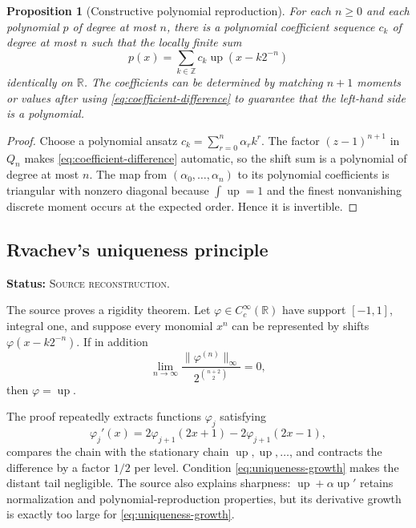 \documentclass[11pt,oneside]{article}
\newtheorem{proposition}[theorem]{Proposition}
\theoremstyle{definition}
\theoremstyle{remark}
\newcommand{\Up}{\operatorname{up}}
\newcommand{\R}{\mathbb{R}}
\newcommand{\Z}{\mathbb{Z}}
\newcommand{\SourceStatus}{\textcolor{SourceBlue}{\textsc{Source reconstruction}}}
\newcommand{\status}[1]{\par\smallskip\noindent\textbf{Status:} #1.\par\smallskip}
\begin{document}
\begin{proposition}[Constructive polynomial reproduction]
\label{prop:constructive-reproduction}
For each \(n\ge0\) and each polynomial \(p\) of degree at most \(n\), there is a polynomial coefficient sequence \(c_k\) of degree at most \(n\) such that the locally finite sum
\begin{equation}
  p(x)=\sum_{k\in\Z}c_k\Up(x-k2^{-n})
  \label{eq:poly-reproduce}
\end{equation}
identically on \(\R\).  The coefficients can be determined by matching \(n+1\) moments or values after using \eqref{eq:coefficient-difference} to guarantee that the left-hand side is a polynomial.
\end{proposition}

\begin{proof}
Choose a polynomial ansatz \(c_k=\sum_{r=0}^{n}\alpha_r k^r\).  The factor \((z-1)^{n+1}\) in \(Q_n\) makes \eqref{eq:coefficient-difference} automatic, so the shift sum is a polynomial of degree at most \(n\).  The map from \((\alpha_0,\ldots,\alpha_n)\) to its polynomial coefficients is triangular with nonzero diagonal because \(\int\Up=1\) and the finest nonvanishing discrete moment occurs at the expected order.  Hence it is invertible.
\end{proof}

\subsection{Rvachev's uniqueness principle}
\status{\SourceStatus}

The source proves a rigidity theorem.  Let \(\varphi\in C_c^\infty(\R)\) have support \([-1,1]\), integral one, and suppose every monomial \(x^n\) can be represented by shifts \(\varphi(x-k2^{-n})\).  If in addition
\begin{equation}
  \lim_{n\to\infty}
  \frac{\|\varphi^{(n)}\|_\infty}
       {2^{\binom{n+2}{2}}}=0,
  \label{eq:uniqueness-growth}
\end{equation}
then \(\varphi=\Up\).

The proof repeatedly extracts functions \(\varphi_j\) satisfying
\begin{equation}
  \varphi_j'(x)=2\varphi_{j+1}(2x+1)-2\varphi_{j+1}(2x-1),
  \label{eq:phi-chain}
\end{equation}
compares the chain with the stationary chain \(\Up,\Up,\ldots\), and contracts the difference by a factor \(1/2\) per level.  Condition \eqref{eq:uniqueness-growth} makes the distant tail negligible.  The source also explains sharpness: \(\Up+\alpha\Up'\) retains normalization and polynomial-reproduction properties, but its derivative growth is exactly too large for \eqref{eq:uniqueness-growth}.
\end{document}
